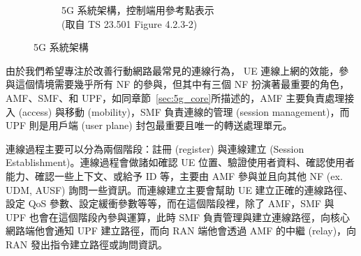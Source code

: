 \begin{figure}[ht]
\begin{subfigure}[b]{.5\linewidth}
        \caption[5G 系統架構，控制端用參考點表示]{{5G 系統架構，控制端用參考點表示\\\scriptsize (取自 TS 23.501 Figure 4.2.3-2)}}
        \label{fig:5g_system_architecture_interface}
    \end{subfigure}
    \caption[5G 系統架構]{{\footnotesize 5G 系統架構~\cite{3gpp.23.501}}}
    \label{fig:5g_system_architecture}
\end{figure}

由於我們希望專注於改善行動網路最常見的連線行為， UE 連線上網的效能，參與這個情境需要幾乎所有 NF 的參與，但其中有三個 NF 扮演著最重要的角色，AMF、SMF、和 UPF，如同章節~\ref{sec:5g_core}所描述的，AMF 主要負責處理接入 (access) 與移動 (mobility)，SMF 負責連線的管理 (session management)，而 UPF 則是用戶端 (user plane) 封包最重要且唯一的轉送處理單元。

連線過程主要可以分為兩個階段：註冊 (register) 與連線建立 (Session Establishment)。連線過程會做諸如確認 UE 位置、驗證使用者資料、確認使用者能力、確認一些上下文、或給予 ID 等，主要由 AMF 參與並且向其他 NF (ex. UDM, AUSF) 詢問一些資訊。而連線建立主要會幫助 UE 建立正確的連線路徑、設定 QoS 參數、設定緩衝參數等等，而在這個階段裡，除了 AMF，SMF 與 UPF 也會在這個階段內參與運算，此時 SMF 負責管理與建立連線路徑，向核心網路端他會通知 UPF 建立路徑，而向 RAN 端他會透過 AMF 的中繼 (relay)，向 RAN 發出指令建立路徑或詢問資訊。


